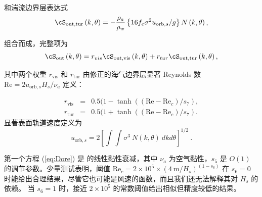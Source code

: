 \noindent
和湍流边界层表达式
\begin{equation}
\cS_{\mathrm{out,tur}} \left(k,\theta\right) = - \frac{\rho_a}{\rho_w}\left\{  16 f_e
\sigma^2 u_{\mathrm{orb},s} / g \right\}
 N\left(k,\theta\right),  \label{eq:swell_turb}
\end{equation}

\noindent
组合而成，完整项为
\begin{equation}
\cS_{\mathrm{out}} \left(k,\theta\right) = r_{vis} \cS_{\mathrm{out,vis}}\left(k,\theta\right)  +
 r_{tur} \cS_{\mathrm{out,tur}}\left(k,\theta\right),
 \label{eq:swell_comb}
\end{equation}

\noindent
其中两个权重 $ r_{\mathrm{vis}} $ 和 $r_{\mathrm{tur}}$ 由修正的海气边界层显著
Reynolds 数 $\mathrm{Re} = 2 u_{\mathrm{orb},s} H_s / \nu_{a}$ 定义：

\begin{eqnarray}
 r_{\mathrm{vis}} &=& 0.5 (1- \tanh((\mathrm{Re}-\mathrm{Re}_{c})/s_7), \\
 r_{\mathrm{tur}}&=& 0.5 (1+ \tanh((\mathrm{Re}-\mathrm{Re}_{c})/s_7) .
\end{eqnarray}
显著表面轨道速度定义为
\begin{equation} u_{\mathrm{orb},s} = 2 \left [  \int \!\!\!\! \int
      \sigma^3 \: N(k,\theta) \: dk d\theta \right ] ^{1/2}
      \: . \label{eq:ub_orbs} \end{equation}

\noindent
第一个方程 (\ref{eq:Dore}) 是 \cite{art:Dore78} 的线性黏性衰减，其中 $\nu_a$
为空气黏性，$s_5$ 是 $O(1)$ 的调节参数。少量测试表明，阈值
Re$_{c}=2 \times 10^5 \times (4~\mathrm{m}/H_s)^{(1-s_6)}$ 在 $s_6=0$
时能给出合理结果，尽管它也可能是风速的函数，而且我们还无法解释其对 $H_s$ 的依赖。
当 $s_6=1$ 时，接近 $2 \times 10^5$ 的常数阈值给出相似但精度较低的结果。

